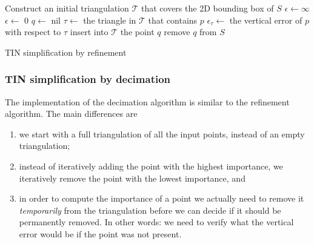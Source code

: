 \begin{algorithm}[tb] 
	Construct an initial triangulation $\mathcal{T}$ that covers the 2D bounding box of $S$ \;
	$\epsilon \leftarrow \infty$ \;
	{
		$\epsilon \leftarrow$ 0 \;
		$q \leftarrow$ nil \;
		{
			$\tau \leftarrow$ the triangle in $\mathcal{T}$ that contains $p$ \;
			$\epsilon_{\tau} \leftarrow$ the vertical error of $p$ with respect to $\tau$ \;
		}
		insert into $\mathcal{T}$ the point $q$ \;
		remove $q$ from $S$ \;
	}
	\caption{TIN simplification by refinement}
	\label{algo:tin-simp:ref}
\end{algorithm}

\subsubsection{TIN simplification by decimation}
The implementation of the decimation algorithm is similar to the refinement algorithm. The main differences are 
\begin{enumerate}
	\item we start with a full triangulation of all the input points, instead of an empty triangulation;
	\item instead of iteratively adding the point with the highest importance, we iteratively remove the point with the lowest importance, and
	\item in order to compute the importance of a point we actually need to remove it \emph{temporarily} from the triangulation before we can decide if it should be permanently removed. In other words: we need to verify what the vertical error would be if the point was not present. 
\end{enumerate}

